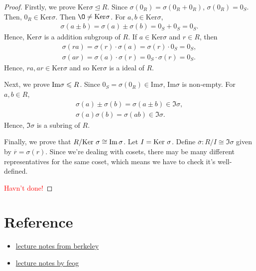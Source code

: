 \begin{proof}
    Firstly, we prove $\text{Ker}\sigma\unlhd R$. 
    Since $\sigma(0_R)=\sigma(0_R+0_R)$, $\sigma(0_R)=0_S$. Then, $0_R\in \text{Ker}\sigma$.
    Then $\O\neq \text{Ker}\sigma$. 
    For $a,b\in\text{Ker}\sigma$, 
    \begin{align*}
        \sigma(a\pm b) =\sigma(a)\pm\sigma(b)=0_S+0_S=0_S.
    \end{align*}
    Hence, $\text{Ker}\sigma$ is a addition subgroup of $R$.
    If $a\in \text{Ker}\sigma$ and $r\in R$, then
    \begin{align*}
        \sigma(ra) = \sigma(r)\cdot \sigma(a) = \sigma(r)\cdot 0_S = 0_S, \\
        \sigma(ar) = \sigma(a)\cdot \sigma(r) = 0_S\cdot\sigma(r) = 0_S.
    \end{align*}
    Hence, $ra,ar\in \text{Ker}\sigma$ and so $\text{Ker}\sigma$ is a ideal of $R$.

    \par
    Next, we prove $\text{Im}\sigma\leqslant R$.
    Since $0_S=\sigma(0_R)\in \text{Im}\sigma$, $\text{Im}\sigma$ is non-empty.
    For $a,b\in R$,
    \begin{align*}
        \sigma(a) \pm \sigma(b) = \sigma(a\pm b)\in \Im\sigma,\\
        \sigma(a)\sigma(b) = \sigma(ab)\in \Im\sigma.
    \end{align*}
    Hence, $\Im\sigma$ is a subring of $R$.
    \par
    Finally, we prove that $R/\text{Ker }\sigma\cong \Im\sigma$. Let $I=\text{Ker }\sigma$.
    Define $\overline{\sigma}:R/I\cong \Im\sigma$ given by $\overline{r}=\sigma(r)$. 
    Since we're dealing with cosets, there may be many different representatives for the same
coset, which means we have to check it's well-defined.

\textcolor{Red}{Havn't done!}
\end{proof}

\section{Reference}
\begin{itemize}
    \item \href{https://math.berkeley.edu/~mcivor/math113su16/113ringnotes2016.pdf}{lecture notes from berkeley}
    \item \href{https://feog.github.io/ring.pdf}{lecture notes by feog}
\end{itemize}

